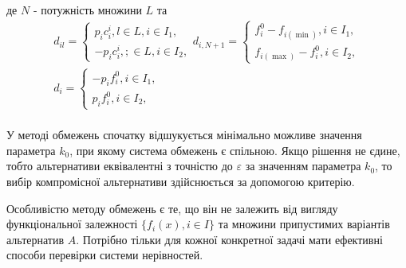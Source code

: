 де $N$ - потужність множини $L$ та
\begin{gather*}
	
	d_{il} = \begin{cases}
		p_i c_{i} ^ i, l \in L, i \in I_1, \\
		-p_i c_{i} ^ i, ; \in L, i \in I_2, 
	\end{cases} 
	
	d_{i, N+1} = \begin{cases}
		f_{i}^0 - f_{i(\min)}, i \in I_1, \\
		f_{i(\max)} - f_{i}^0 , i \in I_2,
	\end{cases} \\

	d_{i} = \begin{cases}
		- p_i f_{i} ^ 0, i \in I_1, \\
		p_i f_{i} ^ 0, i \in I_2, 
	\end{cases} \\

\end{gather*}

У методі обмежень спочатку відшукується мінімально можливе значення параметра $k_0$, при якому система обмежень є спільною. 
Якщо рішення не єдине, тобто альтернативи еквівалентні з точністю до $\varepsilon$ за значенням параметра $k_0$, то вибір 
компромісної альтернативи здійснюється за допомогою критерію.

Особливістю методу обмежень є те, що він не залежить від вигляду функціональної залежності $\{ f_i(x), i \in I \}$ та множини припустимих варіантів альтернатив 
$A$. Потрібно тільки для кожної конкретної задачі мати ефективні способи перевірки системи нерівностей.  


